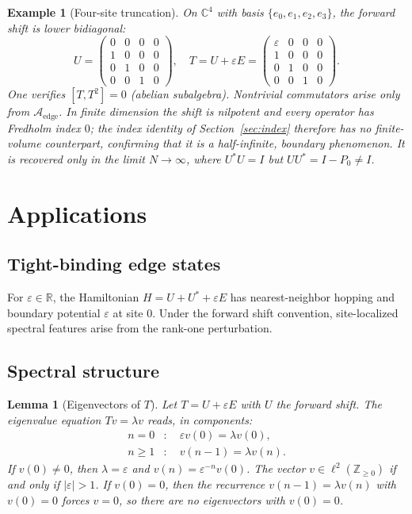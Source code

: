 \documentclass[10pt]{amsart}
\newcommand{\1}{{\mathbb{I}}}
\newtheorem{lemma}[theorem]{Lemma}
\newtheorem{example}[theorem]{Example}
\numberwithin{equation}{section}
\begin{document}
\begin{example}[Four-site truncation]\label{ex:4sites}
On $\mathbb{C}^4$ with basis $\{e_0,e_1,e_2,e_3\}$, the forward shift is lower bidiagonal:
\[
U = \begin{pmatrix} 0&0&0&0\\1&0&0&0\\0&1&0&0\\0&0&1&0 \end{pmatrix}, \quad
T = U + \varepsilon E =
\begin{pmatrix} \varepsilon&0&0&0\\1&0&0&0\\0&1&0&0\\0&0&1&0 \end{pmatrix}.
\]
One verifies $[T,T^2]=0$ (abelian subalgebra). Nontrivial commutators arise only from
$\mathcal{A}_{\mathrm{edge}}$. In finite dimension the shift is nilpotent and every operator has
Fredholm index $0$; the index identity of Section~\ref{sec:index} therefore has no finite-volume
counterpart, confirming that it is a half-infinite, boundary phenomenon. It is
recovered only in the limit $N\to\infty$, where $U^*U=I$ but $UU^*=I-P_0\ne I$.
\end{example}
\section{Applications}
\label{sec:applications}

\subsection{Tight-binding edge states}

For $\varepsilon \in \mathbb{R}$, the Hamiltonian $H = U + U^* + \varepsilon E$ has
nearest-neighbor hopping and boundary potential $\varepsilon$ at site 0. Under the forward
shift convention, site-localized spectral features arise from the rank-one perturbation.

\subsection{Spectral structure}

\begin{lemma}[Eigenvectors of $T$]\label{lem:eigen}
Let $T = U + \varepsilon E$ with $U$ the forward shift. The eigenvalue equation
$Tv = \lambda v$ reads, in components:
\begin{align*}
n=0&: \quad \varepsilon v(0) = \lambda v(0), \\
n \ge 1&: \quad v(n-1) = \lambda v(n).
\end{align*}
If $v(0) \ne 0$, then $\lambda = \varepsilon$ and $v(n) = \varepsilon^{-n} v(0)$. The vector
$v \in \ell^2(\mathbb{Z}_{\ge 0})$ if and only if $|\varepsilon| > 1$.
If $v(0) = 0$, then the recurrence $v(n-1) = \lambda v(n)$ with $v(0) = 0$ forces $v = 0$,
so there are no eigenvectors with $v(0) = 0$.
\end{lemma}
\end{document}
